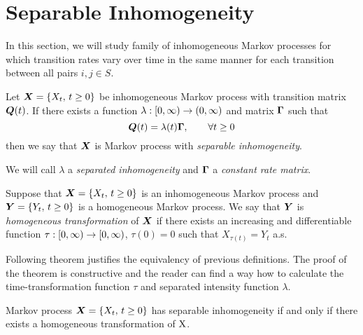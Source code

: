 {%
\section{Separable Inhomogeneity}
\label{chap:separable}

In this section, we will study family of inhomogeneous Markov processes for which transition rates vary over time in the same manner for each transition between all pairs $i, j \in S$.

\begin{definition}
	\label{def:separable}
	Let $\bm{X} = \{ X_t ,\, t \geq 0 \}$ be inhomogeneous Markov process with transition matrix $\bm{Q} (t)$. If there exists a function $\lambda: [0, \infty) \to (0, \infty)$ and matrix $\bm{\Gamma}$ such that
\[
	\bm{Q}(t) = \lambda(t) \bm{\Gamma}, \qquad \forall t \geq 0
\]
then we say that $\bm{X}$ is Markov process with \emph{separable inhomogeneity}.

We will call $\lambda$ a \emph{separated inhomogeneity} and $\bm{\Gamma}$ a \emph{constant rate matrix}.
\end{definition}

\begin{definition}
	\label{def:homoTrans}
	Suppose that $\bm{X} = \{ X_t ,\, t \geq 0 \}$ is an inhomogeneous Markov process and $\bm{Y} = \{Y_t, \, t \geq 0 \}$ is a homogeneous Markov process. We say that $\bm{Y}$ is \emph{homogeneous transformation} of $\bm{X}$ if there exists an increasing and differentiable function $\tau : [0, \infty) \to [0, \infty)$, $\tau (0) = 0$ such that $X_{\tau(t)} = Y_t$ a.s.
\end{definition}

Following theorem justifies the equivalency of previous definitions. The proof of the theorem is constructive and the reader can find a way how to calculate the time-transformation function $\tau$ and separated intensity function $\lambda$.

\begin{proposition}
	\label{prop:separable}
	Markov process $\bm{X} = \{ X_t ,\, t \geq 0 \}$ has separable inhomogeneity if and only if there exists a homogeneous transformation of $\operatorname{\bm{X}}$.
\end{proposition}

}

